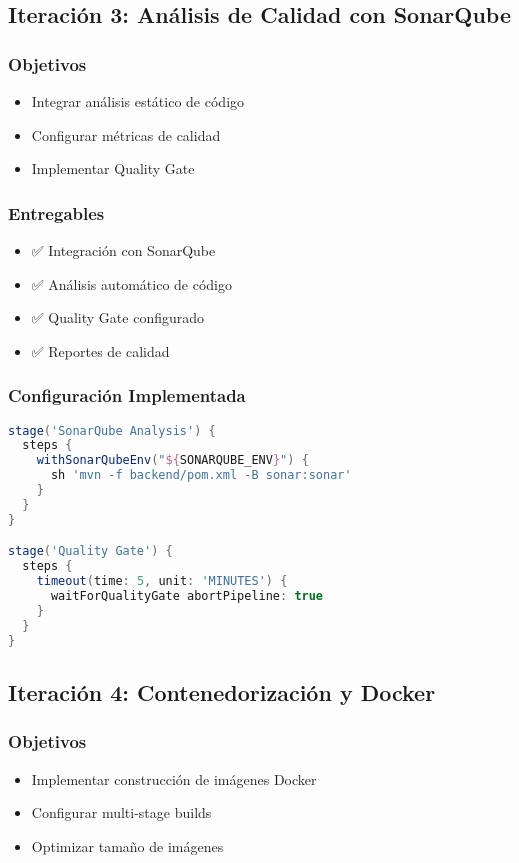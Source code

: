 \documentclass[12pt,a4paper]{article}
\begin{document}
\subsection{Iteración 3: Análisis de Calidad con SonarQube}

\subsubsection{Objetivos}
\begin{itemize}
    \item Integrar análisis estático de código
    \item Configurar métricas de calidad
    \item Implementar Quality Gate
\end{itemize}

\subsubsection{Entregables}
\begin{itemize}
    \item ✅ Integración con SonarQube
    \item ✅ Análisis automático de código
    \item ✅ Quality Gate configurado
    \item ✅ Reportes de calidad
\end{itemize}

\subsubsection{Configuración Implementada}
\begin{lstlisting}[language=groovy]
stage('SonarQube Analysis') {
  steps {
    withSonarQubeEnv("${SONARQUBE_ENV}") {
      sh 'mvn -f backend/pom.xml -B sonar:sonar'
    }
  }
}

stage('Quality Gate') {
  steps {
    timeout(time: 5, unit: 'MINUTES') {
      waitForQualityGate abortPipeline: true
    }
  }
}
\end{lstlisting}

\subsection{Iteración 4: Contenedorización y Docker}

\subsubsection{Objetivos}
\begin{itemize}
    \item Implementar construcción de imágenes Docker
    \item Configurar multi-stage builds
    \item Optimizar tamaño de imágenes
\end{itemize}
\end{document}
